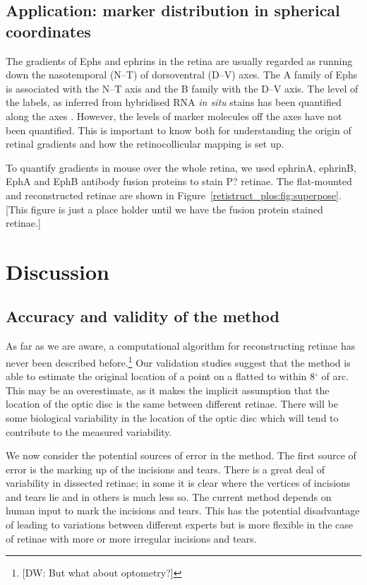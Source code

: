 \documentclass[10pt]{article}
\newcommand{\todo}[1]{{\color{red}[#1]}}
\begin{document}
\subsection*{Application: marker distribution in spherical coordinates}

The gradients of Ephs and ephrins in the retina are usually regarded
as running down the nasotemporal (N--T) of dorsoventral (D--V)
axes. The A family of Ephs is associated with the N--T axis and the B
family with the D--V axis. The level of the labels, as inferred from
hybridised RNA \emph{in situ} stains has been quantified along the
axes \cite{ChenEtal95comp,RebeEtal04rela}.  However, the levels of
marker molecules off the axes have not been quantified. This is
important to know both for understanding the origin of retinal
gradients and how the retinocollicular mapping is set up. 

To quantify gradients in mouse over the whole retina, we used ephrinA,
ephrinB, EphA and EphB antibody fusion proteins to stain P?
retinae. The flat-mounted and reconstructed retinae are shown in
Figure~\ref{retistruct_plos:fig:superpose}.
\todo{This figure is just a place holder until we have the fusion
  protein stained retinae.}

\section*{Discussion}

\subsection*{Accuracy and validity of the method}

As far as we are aware, a computational algorithm for reconstructing
retinae has never been described
before.\footnote{\todo{DW: But what about optometry?}} Our validation
studies suggest that the method is able to estimate the original
location of a point on a flatted to within 8$^\circ$ of arc. This may
be an overestimate, as it makes the implicit assumption that the
location of the optic disc is the same between different retinae.
There will be some biological variability in the location of the
optic disc which will tend to contribute to the measured variability.

We now consider the potential sources of error in the method. The
first source of error is the marking up of the incisions and
tears. There is a great deal of variability in dissected retinae; in
some it is clear where the vertices of incisions and tears lie and in
others is much less so. The current method depends on human input to
mark the incisions and tears. This has the potential disadvantage of
leading to variations between different experts but is more flexible
in the case of retinae with more or more irregular incisions and
tears. 
\end{document}
